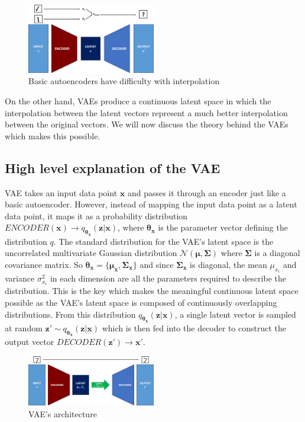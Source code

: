             \begin{figure}[H]
                \centering
                \includegraphics[width=0.5\textwidth]{imgs/interpolation_fail.png}
                \caption{Basic autoencoders have difficulty with interpolation}
                \label{fig:int_fail}
            \end{figure}
            
            On the other hand, VAEs produce a continuous latent space in which the interpolation between the latent vectors represent a much better interpolation between the original vectors. We will now discuss the theory behind the VAEs which makes this possible.
            
        \subsection{High level explanation of the VAE}
            VAE takes an input data point $\bm{x}$ and passes it through an encoder just like a basic autoencoder. However, instead of mapping the input data point as a latent data point, it maps it as a probability distribution $ENCODER(\bm{x}) \rightarrow q_{\bm{\theta_x}}(\bm{z}|\bm{x})$, where $\bm{\theta_x}$ is the parameter vector defining the distribution $q$. The standard distribution for the VAE's latent space is the uncorrelated multivariate Gaussian distribution $\mathcal{N}(\bm{\mu}, \bm{\Sigma})$ where $\bm{\Sigma}$ is a diagonal covariance matrix. So $\bm{\theta_x} = \{\bm{\mu_x}, \bm{\Sigma_x}\}$ and since $\bm{\Sigma_x}$ is diagonal, the mean $\mu_{x_i}$ and variance $\sigma_{x_i}^2$ in each dimension are all the parameters required to describe the distribution. This is the key which makes the meaningful continuous latent space possible as the VAE's latent space is composed of continuously overlapping distributions. From this distribution $q_{\bm{\theta_x}}(\bm{z}|\bm{x})$, a single latent vector is sampled at random $\bm{z'} \sim q_{\bm{\theta_x}}(\bm{z}|\bm{x})$ which is then fed into the decoder to construct the output vector $DECODER(\bm{z'}) \rightarrow \bm{x'}$.
            
            \begin{figure}[H]
                \centering
                \includegraphics[width=0.5\textwidth]{imgs/vae_arch.png}
                \caption{VAE's architecture}
                \label{fig:vae_arch}
            \end{figure}

